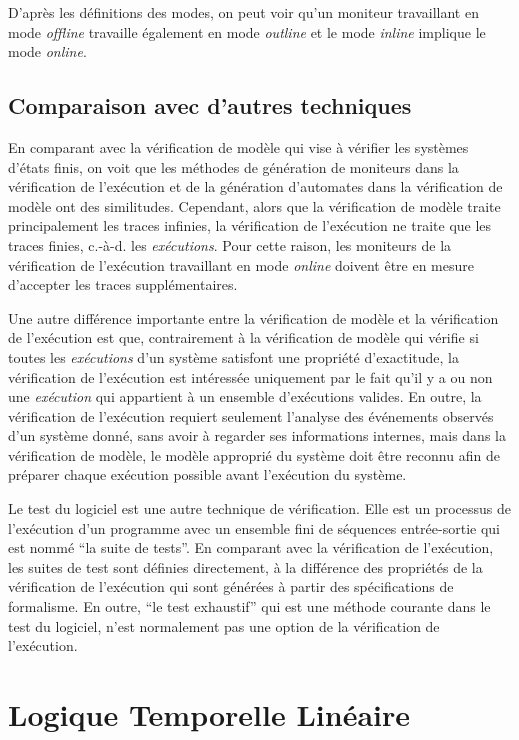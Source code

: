D'après les définitions des modes, on peut voir qu'un moniteur travaillant en mode \emph{offline} travaille également en mode \emph{outline} et le mode \emph{inline} implique le mode \emph{online}.

\subsection{Comparaison avec d'autres techniques}

En comparant avec la vérification de modèle \citep{clarke1999model} qui vise à vérifier les systèmes d'états finis, on voit que les méthodes de génération de moniteurs dans la vérification de l'exécution et de la génération d'automates dans la vérification de modèle ont des similitudes. Cependant, alors que la vérification de modèle traite principalement les traces infinies, la vérification de l'exécution ne traite que les traces finies, c.-à-d. les \emph{exécutions}. Pour cette raison, les moniteurs de la vérification de l'exécution travaillant en mode \emph{online} doivent être en mesure d'accepter les traces supplémentaires.

Une autre différence importante entre la vérification de modèle et la vérification de l'exécution est que, contrairement à la vérification de modèle qui vérifie si toutes les \emph{exécutions} d'un système satisfont une propriété d'exactitude, la vérification de l'exécution est intéressée uniquement par le fait qu'il y a ou non une \emph{exécution} qui appartient à un ensemble d'exécutions valides. En outre, la vérification de l'exécution requiert seulement l'analyse des événements observés d'un système donné, sans avoir à regarder ses informations internes, mais dans la vérification de modèle, le modèle approprié du système doit être reconnu afin de préparer chaque exécution possible avant l'exécution du système. \citep{leucker2009brief}

Le test du logiciel \citep{broy2005model} est une autre technique de vérification. Elle est un processus de l'exécution d'un programme avec un ensemble fini de séquences entrée-sortie qui est nommé ``la suite de tests''. En comparant avec la vérification de l'exécution, les suites de test sont définies directement, à la différence des propriétés de la vérification de l'exécution qui sont générées à partir des spécifications de formalisme. En outre, ``le test exhaustif'' qui est une méthode courante dans le test du logiciel, n'est normalement pas une option de la vérification de l'exécution.

\section{Logique Temporelle Linéaire}

